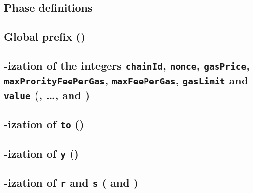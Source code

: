 \subsection{Phase definitions}              \label{rlptxn: phase definitions}                 

\subsection{Global \rlp{} prefix (\phaseRlpPrefix)}                                           
\subsection{\rlp{}-ization of the integers
\texttt{chainId},
\texttt{nonce},
\texttt{gasPrice},
\texttt{maxProrityFeePerGas},
\texttt{maxFeePerGas},
\texttt{gasLimit} and \texttt{value} (\phaseChainId{}, \dots, \phaseGasLimit{} and \phaseValue{})}
                                                                                              
\subsection{\rlp{}-ization of \texttt{to} (\phaseTo)}                                             
\subsection{\rlp{}-ization of \texttt{y} (\phaseY)}                                           
\subsection{\rlp{}-ization of \texttt{r} and \texttt{s} (\phaseR{} and \phaseS)}              
